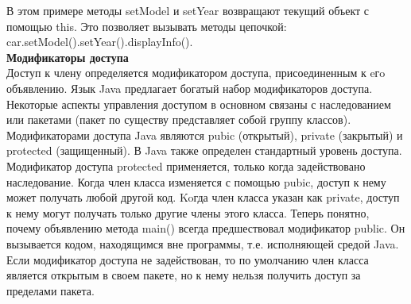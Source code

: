 В этом примере методы setModel и setYear возвращают текущий объект с помощью this. Это позволяет вызывать методы цепочкой: \\  car.setModel().setYear().displayInfo(). \\
\textbf{Модификаторы доступа} \\
Доступ к члену определяется модификатором доступа, присоединенным к eгo объявлению. Язык Java предлагает богатый набор модификаторов доступа. Некоторые аспекты управления доступом в основном связаны с наследованием или пакетами (пакет по существу представляет собой группу классов). Модификаторами доступа Java являются pubic (открытый), private (закрытый) и protected (защищенный). В Java также определен стандартный уровень доступа. Модификатор доступа protected применяется, только когда задействовано наследование. Когда член класса изменяется с помощью pubic, доступ к нему может получать любой другой код. Koгда член класса указан как private, доступ к нему могут получать только другие члены этого класса. Теперь понятно, почему объявлению метода main() всегда предшествовал модификатор public. Он вызывается кодом, находящимся вне программы, т.е. исполняющей средой Java. Если модификатор доступа не задействован, то по умолчанию член класса является открытым в своем пакете, но к нему нельзя получить доступ за пределами пакета. \\
